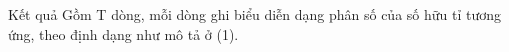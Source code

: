 Kết quả
Gồm T dòng, mỗi dòng ghi biểu diễn dạng phân số của số hữu tỉ tương ứng, theo định dạng như mô tả ở (1).